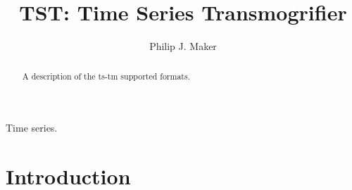 \documentclass[final,technote,narroweqnarray,inline,twoside]{ieee}
\begin{document}
\title[Data Formats]{TST: Time Series Transmogrifier}
\author[SHORT NAMES]{%
    Philip J. Maker 
  }
\maketitle               

\begin{abstract}
A description of the ts-tm supported formats.
\end{abstract}

\begin{keywords}
Time series.
\end{keywords}

\section{Introduction}
\end{document}
